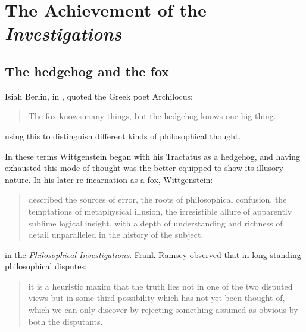 \chapter{The Achievement of the {\it Investigations}}

\section{The hedgehog and the fox}

Isiah Berlin, in \cite{berlinHF}, quoted the Greek poet Archilocus:
\begin{quotation}
\noindent
The fox knows many things, but the hedgehog knows one big thing.
\end{quotation}
using this to distinguish different kinds of philosophical thought.

In these terms Wittgenstein began with his Tractatus as a hedgehog, and having exhausted this mode of thought was the better equipped to show its illusory nature.
In his later re-incarnation as a fox, Wittgenstein:
\begin{quotation}
\noindent
described the sources of error, the roots of philosophical confusion, the temptations of metaphysical illusion, the irresistible allure of apparently sublime logical insight, with a depth of understanding and richness of detail unparalleled in the history of the subject.
\end{quotation}
in the {\it Philosophical Investigations}.
Frank Ramsey observed \cite{ramseyU} that in long standing philosophical disputes:
\begin{quotation}
\noindent
it is a heuristic maxim that the truth lies not in one of the two disputed views but in some third possibility which has not yet been thought of, which we can only discover by rejecting something assumed as obvious by both the disputants.
\end{quotation}

